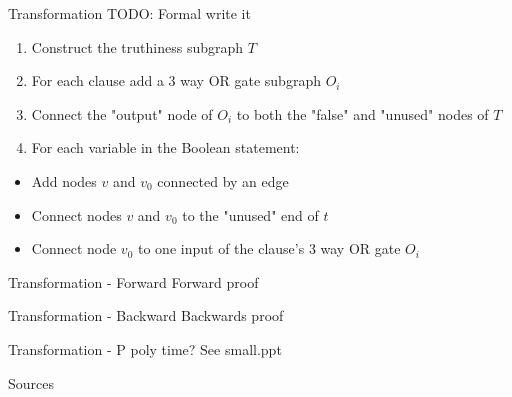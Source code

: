 \documentclass[bigger]{beamer}
\begin{document}
\begin{frame}[label=sec-15]{Transformation}
TODO: Formal write it\\
\begin{enumerate}
\item<1-> Construct the truthiness subgraph \(T\)\\
\item<2-> For each clause add a 3 way OR gate subgraph \(O_i\)\\
\item<3-> Connect the "output" node of \(O_i\) to both the "false" and "unused" nodes of \(T\)
\item<4-> For each variable in the Boolean statement:
\end{enumerate}
\begin{itemize}
\item<5->      Add nodes \(v\) and \(v_0\) connected by an edge
\item<6->      Connect nodes \(v\) and \(v_0\) to the "unused" end of \(t\)
\item<7->      Connect node \(v_0\) to one input of the clause's 3 way OR gate \(O_i\)
\end{itemize}
\end{frame}

\begin{frame}[label=sec-16]{Transformation - Forward}
Forward proof
\end{frame}

\begin{frame}[label=sec-17]{Transformation - Backward}
Backwards proof
\end{frame}

\begin{frame}[label=sec-18]{Transformation - P}
poly time? See small.ppt
\end{frame}

\begin{frame}[label=sec-19]{Sources}
\end{frame}
\end{document}
